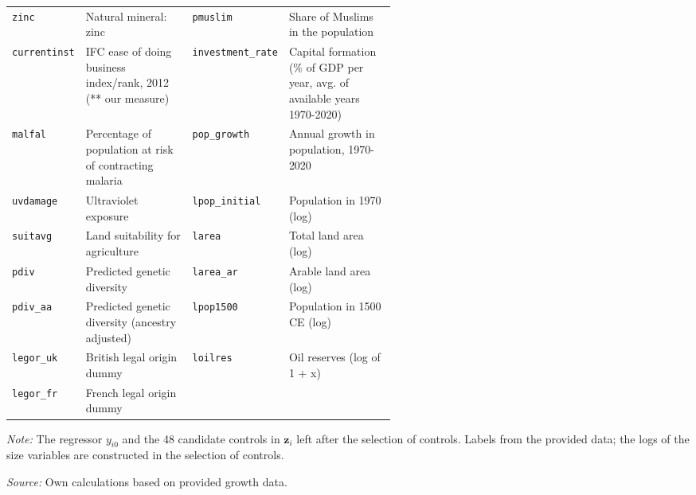 \begin{table}[!htbp]
\begin{threeparttable}
\begin{tabular}{lp{0.28\linewidth}lp{0.28\linewidth}}
\texttt{zinc} & \raggedright Natural mineral: zinc & \texttt{pmuslim} & \raggedright Share of Muslims in the population \tabularnewline
\texttt{currentinst} & \raggedright IFC ease of doing business index/rank, 2012 (** our measure) & \texttt{investment\_rate} & \raggedright Capital formation (\% of GDP per year, avg. of available years 1970-2020) \tabularnewline
\texttt{malfal} & \raggedright Percentage of population at risk of contracting malaria & \texttt{pop\_growth} & \raggedright Annual growth in population, 1970-2020 \tabularnewline
\texttt{uvdamage} & \raggedright Ultraviolet exposure & \texttt{lpop\_initial} & \raggedright Population in 1970 (log) \tabularnewline
\texttt{suitavg} & \raggedright Land suitability for agriculture & \texttt{larea} & \raggedright Total land area (log) \tabularnewline
\texttt{pdiv} & \raggedright Predicted genetic diversity & \texttt{larea\_ar} & \raggedright Arable land area (log) \tabularnewline
\texttt{pdiv\_aa} & \raggedright Predicted genetic diversity (ancestry adjusted) & \texttt{lpop1500} & \raggedright Population in 1500 CE (log) \tabularnewline
\texttt{legor\_uk} & \raggedright British legal origin dummy & \texttt{loilres} & \raggedright Oil reserves (log of 1 + x) \tabularnewline
\texttt{legor\_fr} & \raggedright French legal origin dummy &  &  \tabularnewline
\bottomrule
\end{tabular}
\begin{tablenotes}[flushleft]
\footnotesize
\item \textit{Note:} The regressor $y_{i0}$ and the 48 candidate controls in $\mathbf{z}_i$ left after the selection of controls. Labels from the provided data; the logs of the size variables are constructed in the selection of controls.
\item \textit{Source:} Own calculations based on provided growth data.
\end{tablenotes}
\end{threeparttable}
\end{table}